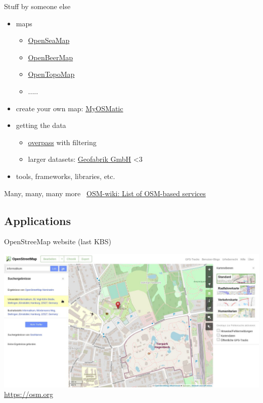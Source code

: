\documentclass{beamer}
\begin{document}
			\begin{frame}{Stuff by someone else}
				\begin{itemize}
					\item maps
					\begin{itemize}
						\item \href{https://map.openseamap.org/?zoom=13.5\&lon=9.96566\&lat=53.52952}{OpenSeaMap}
						\item \href{https://openbeermap.github.io/\#17/53.54957/9.96370}{OpenBeerMap}
						\item \href{https://opentopomap.org}{OpenTopoMap}
						\item .....
					\end{itemize}\pause
					\item create your own map: \href{https://print.get-map.org/}{MyOSMatic}\pause
					\item getting the data
					\begin{itemize}
						\item \href{https://overpass-turbo.eu/}{overpass} with filtering
						\item larger datasets: \href{http://download.geofabrik.de/}{Geofabrik GmbH} <3
					\end{itemize}
					\item tools, frameworks, libraries, etc.
				\end{itemize}
				\pause
				\vspace{0.5cm}
				Many, many, many more \textrightarrow\ \href{https://wiki.openstreetmap.org/wiki/List\_of\_OSM-based\_services}{OSM-wiki: List of OSM-based services}
			\end{frame}
			
		\subsection{Applications}
			
			\begin{frame}{OpenStreeMap website (last KBS)}
				\begin{center}
					\includegraphics[height=0.7\textheight]{images/osm-website-old.jpg}\\
					\url{https://osm.org}
				\end{center}
			\end{frame}
			
\end{document}

